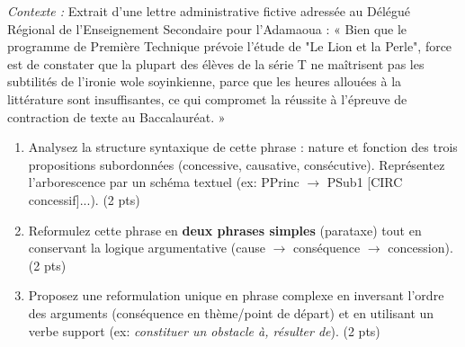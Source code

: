 \documentclass[11pt]{article}
\begin{document}
\begin{exercice}
    \textit{Contexte :} Extrait d'une lettre administrative fictive adressée au Délégué Régional de l'Enseignement Secondaire pour l'Adamaoua : « Bien que le programme de Première Technique prévoie l'étude de "Le Lion et la Perle", force est de constater que la plupart des élèves de la série T ne maîtrisent pas les subtilités de l'ironie wole soyinkienne, parce que les heures allouées à la littérature sont insuffisantes, ce qui compromet la réussite à l'épreuve de contraction de texte au Baccalauréat. »
    \begin{enumerate}
        \item Analysez la structure syntaxique de cette phrase : nature et fonction des trois propositions subordonnées (concessive, causative, consécutive). Représentez l'arborescence par un schéma textuel (ex: PPrinc $\rightarrow$ PSub1 [CIRC concessif]...). (2 pts)
        \item Reformulez cette phrase en \textbf{deux phrases simples} (parataxe) tout en conservant la logique argumentative (cause $\rightarrow$ conséquence $\rightarrow$ concession). (2 pts)
        \item Proposez une reformulation unique en phrase complexe en inversant l'ordre des arguments (conséquence en thème/point de départ) et en utilisant un verbe support (ex: \textit{constituer un obstacle à, résulter de}). (2 pts)
    \end{enumerate}
\end{exercice}
\end{document}
